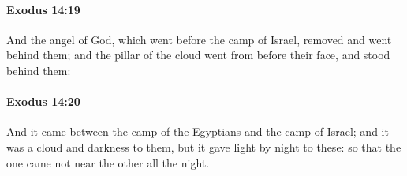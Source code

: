 		\paragraph{Exodus 14:19} %
			\label{EXODUS-14-19}

			And the angel of God, which went before the camp of Israel, removed and went behind them; and the pillar of the cloud went from before their face, and stood behind them:


		\paragraph{Exodus 14:20} %
			\label{EXODUS-14-20}

			And it came between the camp of the Egyptians and the camp of Israel; and it was a cloud and darkness to them, but it gave light by night to these: so that the one came not near the other all the night.

